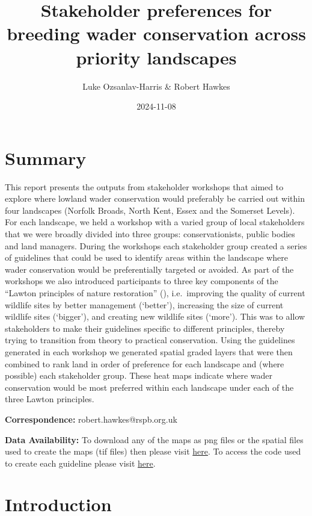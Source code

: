 \documentclass[
  12pt,
  letterpaper,
  DIV=11,
  numbers=noendperiod]{scrartcl}
\title{Stakeholder preferences for breeding wader conservation across
priority landscapes}
\author{Luke Ozsanlav-Harris \& Robert Hawkes}
\date{2024-11-08}
\begin{document}
\maketitle


\section{Summary}\label{summary}

This report presents the outputs from stakeholder workshops that aimed
to explore where lowland wader conservation would preferably be carried
out within four landscapes (Norfolk Broads, North Kent, Essex and the
Somerset Levels). For each landscape, we held a workshop with a varied
group of local stakeholders that we were broadly divided into three
groups: conservationists, public bodies and land managers. During the
workshops each stakeholder group created a series of guidelines that
could be used to identify areas within the landscape where wader
conservation would be preferentially targeted or avoided. As part of the
workshops we also introduced participants to three key components of the
``Lawton principles of nature restoration''
(), i.e.~improving the
quality of current wildlife sites by better management (`better'),
increasing the size of current wildlife sites (`bigger'), and creating
new wildlife sites (`more'). This was to allow stakeholders to make
their guidelines specific to different principles, thereby trying to
transition from theory to practical conservation. Using the guidelines
generated in each workshop we generated spatial graded layers that were
then combined to rank land in order of preference for each landscape and
(where possible) each stakeholder group. These heat maps indicate where
wader conservation would be most preferred within each landscape under
each of the three Lawton principles.

\textbf{Correspondence:} robert.hawkes@rspb.org.uk

\textbf{Data Availability:} To download any of the maps as png files or
the spatial files used to create the maps (tif files) then please visit
\href{https://github.com/LukeOzsanlav/WaderScenarios/tree/main/CleanData/Guideline\%20Creation}{here}.
To access the code used to create each guideline please visit
\href{https://github.com/LukeOzsanlav/WaderScenarios/tree/main/Code/Guideline\%20Creation}{here}.

\newpage{}

\section{Introduction}\label{introduction}
\end{document}
